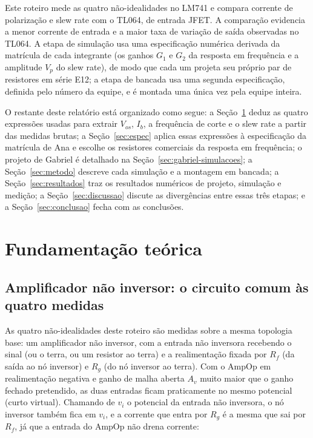 \documentclass[11pt,a4paper]{article}
\begin{document}
Este roteiro mede as quatro não-idealidades no LM741 e compara corrente de
polarização e slew rate com o TL064, de entrada JFET. A comparação evidencia a menor
corrente de entrada e a maior taxa de variação de saída observadas no TL064. A etapa de simulação usa uma especificação numérica derivada da matrícula de cada
integrante (os ganhos \(G_1\) e \(G_2\) da resposta em frequência e a amplitude \(V_p\) do slew
rate), de modo que cada um projeta seu próprio par de resistores em série E12; a etapa de
bancada usa uma segunda especificação, definida pelo número da equipe, e é montada uma única vez
pela equipe inteira.

O restante deste relatório está organizado como segue: a Seção~\ref{sec:teoria} deduz as quatro
expressões usadas para extrair \(V_{os}\), \(I_b\), a frequência de corte e o slew rate a partir
das medidas brutas; a Seção~\ref{sec:espec} aplica essas expressões à especificação da matrícula
de Ana e escolhe os resistores comerciais da resposta em frequência; o projeto de Gabriel
é detalhado na Seção~\ref{sec:gabriel-simulacoes}; a Seção~\ref{sec:metodo}
descreve cada simulação e a montagem em bancada; a Seção~\ref{sec:resultados} traz os resultados
numéricos de projeto, simulação e medição; a Seção~\ref{sec:discussao} discute as divergências
entre essas três etapas; e a Seção~\ref{sec:conclusao} fecha com as conclusões.

\section{Fundamentação teórica}
\label{sec:teoria}

\subsection{Amplificador não inversor: o circuito comum às quatro medidas}

As quatro não-idealidades deste roteiro são medidas sobre a mesma topologia base: um amplificador
não inversor, com a entrada não inversora recebendo o sinal (ou o terra, ou um resistor ao
terra) e a realimentação fixada por \(R_f\) (da saída ao nó inversor) e \(R_g\) (do nó inversor
ao terra). Com o AmpOp em realimentação negativa e ganho de malha aberta \(A_v\) muito maior que
o ganho fechado pretendido, as duas entradas ficam praticamente no mesmo potencial (curto
virtual). Chamando de \(v_i\) o potencial da entrada não inversora, o nó inversor também fica em
\(v_i\), e a corrente que entra por \(R_g\) é a mesma que sai por \(R_f\), já que a entrada do
AmpOp não drena corrente:
\end{document}
